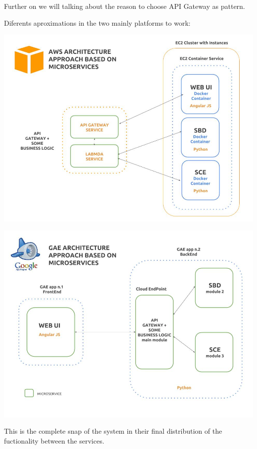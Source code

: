 Further on we will talking about the reason to choose API Gateway as pattern.


Diferents aproximations in the two mainly platforms to work:

\begin{center}
\includegraphics[scale=0.35]{img/graphics/aws_approach.jpg}
\end{center}


\begin{center}
\includegraphics[scale=0.35]{img/graphics/gae_approach.jpg}
\end{center}



This is the complete snap of the system in their final distribution of the
fuctionality between the services.

